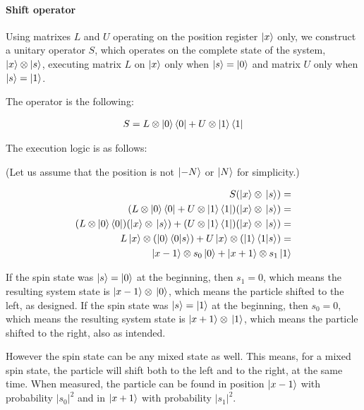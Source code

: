 \paragraph{Shift operator}

Using matrixes $L$ and $U$ operating on the position register $\ket{x}$ only, we construct a unitary operator $S$, which operates on the complete state of the system, $\ket{x} \otimes \ket{s}$, executing matrix $L$ on $\ket{x}$ only when $\ket{s} = \ket{0}$ and matrix $U$ only when $\ket{s}=\ket{1}$.

The operator is the following:

\begin{align}
  S = L\otimes\ket{0}\bra{0} + U\otimes\ket{1}\bra{1}
\end{align}

The execution logic is as follows:


(Let us assume that the position is not $\ket{-N}$ or $\ket{N}$ for simplicity.)

\begin{align}
    S(\ket{x}\otimes{}\ket{s}) = \\
    (L\otimes\ket{0}\bra{0} + U\otimes\ket{1}\bra{1})(\ket{x}\otimes{}\ket{s}) = \\
    (L\otimes\ket{0}\bra{0})(\ket{x}\otimes{}\ket{s}) + (U\otimes\ket{1}\bra{1})(\ket{x}\otimes{}\ket{s}) = \\
    L\ket{x}\otimes(\ket{0}\bra{0}\ket{s}) + U\ket{x}\otimes(\ket{1}\bra{1}\ket{s}) = \\
    \ket{x-1}\otimes{}s_0\ket{0} + \ket{x+1}\otimes{}s_1\ket{1}
\end{align}

If the spin state was $\ket{s} = \ket{0}$ at the beginning, then $s_1=0$, which means the resulting system state is $\ket{x-1}\otimes{}\ket{0}$, which means the particle shifted to the left, as designed. If the spin state was $\ket{s} = \ket{1}$ at the beginning, then $s_0=0$, which means the resulting system state is $\ket{x+1}\otimes{}\ket{1}$, which means the particle shifted to the right, also as intended.

However the spin state can be any mixed state as well. This means, for a mixed spin state, the particle will shift both to the left and to the right, at the same time. When measured, the particle can be found in position $\ket{x-1}$ with probability $|s_0|^2$ and in $\ket{x+1}$ with probability $|s_1|^2$.

